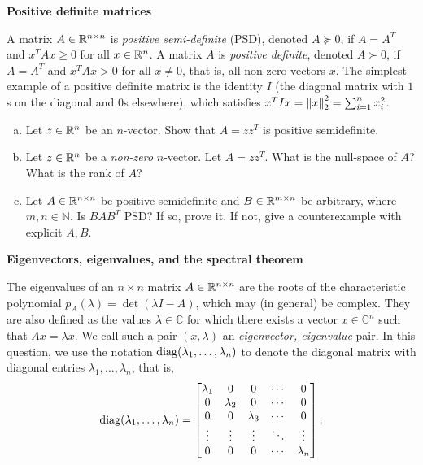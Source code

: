 
\item {} \textbf{Positive definite matrices}

  A matrix $A \in \mathbb{R}^{n \times n}$ is \emph{positive semi-definite}
  (PSD), denoted $A \succeq 0$, if
  $A = A^T$ and $x^T A x \ge 0$ for all $x \in \mathbb{R}^n$.
  A matrix $A$ is \emph{positive definite}, denoted $A \succ 0$,
  if $A = A^T$ and $x^T A x > 0$ for all $x \neq 0$, that is,
  all non-zero vectors $x$. The simplest example of a positive
  definite matrix is the identity  $I$ (the diagonal matrix with $1$s on
  the diagonal and $0$s elsewhere), which satisfies
  $x^T I x = \left\|{x}\right\|_2^2 = \sum_{i = 1}^n x_i^2$.
  \begin{enumerate}[(a)]
  \item Let $z \in \mathbb{R}^n$ be an $n$-vector.
    Show that $A = zz^T$ is positive semidefinite.

  \item Let $z \in \mathbb{R}^n$ be a \emph{non-zero} $n$-vector.
    Let $A = zz^T$. What is the null-space of $A$?
    What is the rank of $A$?


  \item Let $A \in \mathbb{R}^{n \times n}$ be positive semidefinite and
    $B \in \mathbb{R}^{m \times n}$ be arbitrary, where $m, n \in \mathbb{N}$. Is
    $BAB^T$ PSD?  If so, prove it.  If not, give a counterexample with
    explicit $A, B$.

  \end{enumerate}

\newpage

  \item {} \textbf{Eigenvectors, eigenvalues, and the spectral
    theorem}

  The eigenvalues of an $n \times n$ matrix $A \in \mathbb{R}^{n \times n}$ are the
  roots of the characteristic polynomial $p_A(\lambda) = \det(\lambda I - A)$,
  which may (in general) be complex.  They are also defined as the values
  $\lambda \in \mathbb{C}$ for which there exists a vector
  $x \in \mathbb{C}^n$ such that $Ax = \lambda x$. We call such a pair
  $(x, \lambda)$ an \emph{eigenvector, eigenvalue} pair.
  In this question, we use the notation
  $\mathop{\rm diag}(\lambda_1, \ldots, \lambda_n)$ to denote the diagonal matrix with
  diagonal entries $\lambda_1, \ldots, \lambda_n$, that is,
    \begin{equation*}
      \mathop{\rm diag}(\lambda_1, \ldots, \lambda_n)
      = \left[\begin{matrix} \lambda_1 & 0 & 0 & \cdots & 0 \\
          0 & \lambda_2 & 0 & \cdots & 0 \\
          0 & 0 & \lambda_3 & \cdots & 0 \\
          \vdots & \vdots & \vdots & \ddots  & \vdots \\
          0 & 0 & 0 & \cdots & \lambda_n \end{matrix} \right].
    \end{equation*}
    
